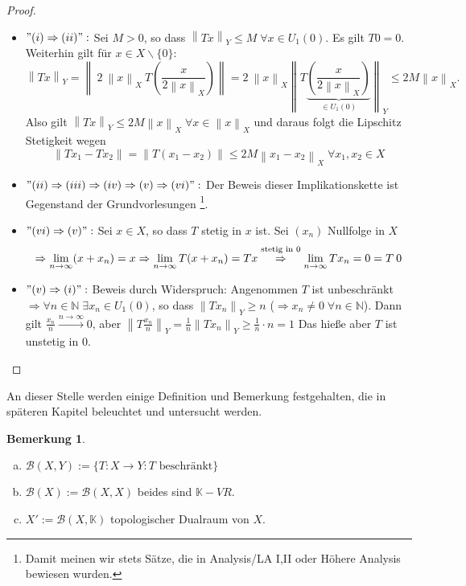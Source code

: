 \documentclass[ngerman]{report}
\theoremstyle{plain}%
\theoremstyle{definition}%
\theoremstyle{myStyle}
\newtheorem{bem}[thm]{Bemerkung}
\newcommand{\N}{\mathbb{N}}
\newcommand{\K}{\mathbb{K}}
\newcommand{\B}{\mathcal{B}} %
\newcommand{\norm}[1]{\left \|#1\right\| }
\newcommand{\df}[1][]{%
	\overset{#1}{\Rightarrow}
}
\newcommand{\U}[2][1]{U_{#1}(#2)} %
\newcommand{\EK}{\U{0}} %
\newcommand{\limes}[1][\infty]{\lim_{n \to #1}}
\begin{document}
	\begin{proof}
		\begin{itemize}[]
			\item $"(i) \df (ii)":$ 
				Sei $M > 0$, so dass $\norm{Tx}_Y \leq M \; \forall x \in U_1(0)$. Es gilt $T0 = 0$.
				Weiterhin gilt für $x \in X\backslash \{0\}$: 
				$$\norm{Tx}_Y = \norm{\: 2 \: \norm{x}_X \: T\left(\frac{x}{2 \norm{x}_X}\right)}
			  =	2 \: \norm{x}_X\norm{T\underbrace{\left(\frac{x}{2 \norm{x}_X}\right)}_{\in \EK}}_Y
				\leq 2 M \norm{x}_X.$$
				Also gilt $\norm{Tx}_Y \leq 2M \norm{x}_X \; \forall x \in \norm{x}_X$ 
				und daraus folgt die Lipschitz Stetigkeit wegen 
				$$ \norm{Tx_1 - Tx_2} = \norm{ T(x_1 - x_2)} \leq 2 M \norm{x_1 - x_2}_X \; \forall x_1, x_2\in X$$ 
											
			\item $"(ii) \df (iii) \df (iv) \df (v) \df (vi)":$ 
				Der Beweis dieser Implikationskette ist Gegenstand der Grundvorlesungen \footnote{Damit meinen wir stets Sätze, die in Analysis\slash LA I,II oder Höhere Analysis bewiesen wurden.}.
				
			\item $"(vi) \df (v)":$ 
				Sei $x \in X$, so dass $T$ stetig in $x$ ist. Sei $(x_n)$ Nullfolge in $X$
				$$\df \limes (x + x_n) = x \df \limes T(x+x_n) = Tx 
				\overset{\text{stetig in 0}}{\df}\limes T x_n = 0 = T\:0$$ 

			\item $"(v) \df (i)":$ Beweis durch Widerspruch:
				Angenommen $T$ ist unbeschränkt $\df \forall n \in \N \; \exists x_n \in \EK$, so dass
				$\norm{Tx_n}_Y \geq n$ ($\df x_n \not = 0 \; \forall n\in\N$). 
				Dann gilt $\frac{x_n}{n} \overset{n\to\infty}{\longrightarrow} 0$,
				aber $\norm{T\frac{x_n}{n}}_Y = \frac{1}{n} \norm{T x_n}_Y \geq \frac{1}{n} \cdot n = 1$
				Das hieße aber $T$ ist unstetig in 0. 

		\end{itemize}
	\end{proof}

An dieser Stelle werden einige Definition und Bemerkung festgehalten, die in späteren Kapitel beleuchtet und untersucht werden.
	\begin{bem} 
		\begin{enumerate}[a)]
			\item $\B(X,Y) := \{ T: X\to Y: T \text{ beschränkt}\}$
			\item $\B(X) := \B(X,X)$ beides sind $\K-VR$.
			\item $X' := \B(X,\K)$ topologischer Dualraum von	$X$.
		\end{enumerate}
	\end{bem}					
	
\end{document}
